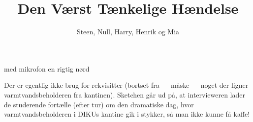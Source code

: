 \documentclass[a4paper,11pt]{article}
\title{Den Værst Tænkelige Hændelse}
\author{Steen, Null, Harry, Henrik og Mia}
\begin{document}
\maketitle

\begin{roles}
 med mikrofon
 en rigtig nørd


\end{roles}


Der er egentlig ikke brug for rekvisitter (bortset fra --- måske ---
noget der ligner varmtvandsbeholderen fra kantinen). Sketchen går ud
på, at intervieweren lader de studerende fortælle (efter tur) om den
dramatiske dag, hvor varmtvandsbeholderen i DIKUs kantine gik i
stykker, så man ikke kunne få kaffe!
\end{document}
